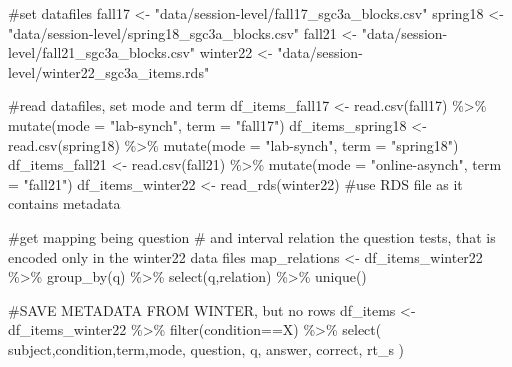 \documentclass[
  letterpaper,
  DIV=11,
  numbers=noendperiod]{scrreprt}
\newenvironment{Shaded}{\begin{snugshade}}{\end{snugshade}}
\newcommand{\AttributeTok}[1]{\textcolor[rgb]{0.40,0.45,0.13}{#1}}
\newcommand{\CommentTok}[1]{\textcolor[rgb]{0.37,0.37,0.37}{#1}}
\newcommand{\FunctionTok}[1]{\textcolor[rgb]{0.28,0.35,0.67}{#1}}
\newcommand{\NormalTok}[1]{\textcolor[rgb]{0.00,0.23,0.31}{#1}}
\newcommand{\OtherTok}[1]{\textcolor[rgb]{0.00,0.23,0.31}{#1}}
\newcommand{\SpecialCharTok}[1]{\textcolor[rgb]{0.37,0.37,0.37}{#1}}
\newcommand{\StringTok}[1]{\textcolor[rgb]{0.13,0.47,0.30}{#1}}
\begin{document}
\begin{Shaded}
\begin{Highlighting}[]
\CommentTok{\#set datafiles}
\NormalTok{fall17 }\OtherTok{\textless{}{-}} \StringTok{"data/session{-}level/fall17\_sgc3a\_blocks.csv"}
\NormalTok{spring18 }\OtherTok{\textless{}{-}} \StringTok{"data/session{-}level/spring18\_sgc3a\_blocks.csv"}
\NormalTok{fall21 }\OtherTok{\textless{}{-}} \StringTok{"data/session{-}level/fall21\_sgc3a\_blocks.csv"}
\NormalTok{winter22 }\OtherTok{\textless{}{-}} \StringTok{"data/session{-}level/winter22\_sgc3a\_items.rds"}

\CommentTok{\#read datafiles, set mode and term}
\NormalTok{df\_items\_fall17 }\OtherTok{\textless{}{-}} \FunctionTok{read.csv}\NormalTok{(fall17) }\SpecialCharTok{\%\textgreater{}\%} \FunctionTok{mutate}\NormalTok{(}\AttributeTok{mode =} \StringTok{"lab{-}synch"}\NormalTok{, }\AttributeTok{term =} \StringTok{"fall17"}\NormalTok{)}
\NormalTok{df\_items\_spring18 }\OtherTok{\textless{}{-}} \FunctionTok{read.csv}\NormalTok{(spring18) }\SpecialCharTok{\%\textgreater{}\%} \FunctionTok{mutate}\NormalTok{(}\AttributeTok{mode =} \StringTok{"lab{-}synch"}\NormalTok{, }\AttributeTok{term =} \StringTok{"spring18"}\NormalTok{)}
\NormalTok{df\_items\_fall21 }\OtherTok{\textless{}{-}} \FunctionTok{read.csv}\NormalTok{(fall21) }\SpecialCharTok{\%\textgreater{}\%} \FunctionTok{mutate}\NormalTok{(}\AttributeTok{mode =} \StringTok{"online{-}asynch"}\NormalTok{, }\AttributeTok{term =} \StringTok{"fall21"}\NormalTok{)}
\NormalTok{df\_items\_winter22 }\OtherTok{\textless{}{-}} \FunctionTok{read\_rds}\NormalTok{(winter22) }\CommentTok{\#use RDS file as it contains metadata}

\CommentTok{\#get mapping being question \# and interval relation the question tests, that is encoded only in the winter22 data files}
\NormalTok{map\_relations }\OtherTok{\textless{}{-}}\NormalTok{ df\_items\_winter22 }\SpecialCharTok{\%\textgreater{}\%} \FunctionTok{group\_by}\NormalTok{(q) }\SpecialCharTok{\%\textgreater{}\%} \FunctionTok{select}\NormalTok{(q,relation) }\SpecialCharTok{\%\textgreater{}\%} \FunctionTok{unique}\NormalTok{()}


\CommentTok{\#SAVE METADATA FROM WINTER, but no rows }
\NormalTok{df\_items }\OtherTok{\textless{}{-}}\NormalTok{ df\_items\_winter22 }\SpecialCharTok{\%\textgreater{}\%} \FunctionTok{filter}\NormalTok{(condition}\SpecialCharTok{==}\StringTok{\textquotesingle{}X\textquotesingle{}}\NormalTok{) }\SpecialCharTok{\%\textgreater{}\%} \FunctionTok{select}\NormalTok{(}
\NormalTok{  subject,condition,term,mode,}
\NormalTok{  question, q, answer, correct, rt\_s}
\NormalTok{) }
  

\end{Highlighting}
\end{Shaded}
\end{document}
